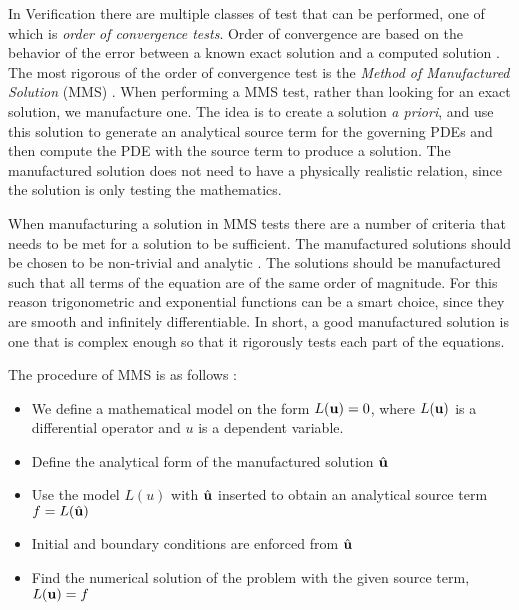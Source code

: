 In Verification there are multiple classes of test that can be performed, one of which is \textit{order of convergence tests}. Order of convergence are based on the behavior of the error between a known exact solution and a computed solution \cite{Roache2002}. The most rigorous of the order of convergence test is the \textit{Method of Manufactured Solution} (MMS) \cite{Oberkampf2010}. When performing a MMS test, rather than looking for an exact solution, we manufacture one. The idea is to create a solution \textit{a priori}, and use this solution to generate an analytical source term for the governing PDEs and then compute the PDE with the source term to produce a solution. The manufactured solution does not need to have a physically realistic relation, since the solution is only testing the mathematics. \newline

When manufacturing a solution in MMS tests there are a number of criteria that needs to be met for a solution to be sufficient. The manufactured solutions should be chosen to be non-trivial and analytic \cite{Oberkampf2010, Roache2002}. The solutions should be manufactured such that all terms of the equation are of the same order of magnitude. For this reason trigonometric and exponential functions can be a smart choice, since they are smooth and infinitely differentiable. In short, a good manufactured solution is one that is complex enough so that it rigorously tests each part of the equations.\newline 

The procedure of MMS is as follows \cite{Oberkampf2010}:
\begin{itemize}
\item We define a mathematical model on the form $ L(\bold{u}) = 0$, where $L(\bold{u})$ is a differential operator and $u$ is a dependent variable.
\item Define the analytical form of the manufactured solution $\hat{\bold{u}}$
\item Use the model $L(u)$ with $\hat{\bold{u}}$ inserted to obtain an analytical source term $ f = L(\hat{\bold{u}}) $
\item Initial and boundary conditions are enforced from $\hat{\bold{u}}$
\item Find the numerical solution of the problem with the given source term, $L(\bold{u}) = f $
\end{itemize}

